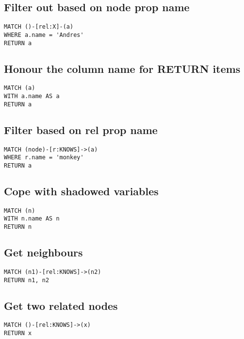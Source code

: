 \subsection{Filter out based on node prop name}

\begin{lstlisting}
MATCH ()-[rel:X]-(a)
WHERE a.name = 'Andres'
RETURN a
\end{lstlisting}

\subsection{Honour the column name for RETURN items}

\begin{lstlisting}
MATCH (a)
WITH a.name AS a
RETURN a
\end{lstlisting}

\subsection{Filter based on rel prop name}

\begin{lstlisting}
MATCH (node)-[r:KNOWS]->(a)
WHERE r.name = 'monkey'
RETURN a
\end{lstlisting}

\subsection{Cope with shadowed variables}

\begin{lstlisting}
MATCH (n)
WITH n.name AS n
RETURN n
\end{lstlisting}

\subsection{Get neighbours}

\begin{lstlisting}
MATCH (n1)-[rel:KNOWS]->(n2)
RETURN n1, n2
\end{lstlisting}

\subsection{Get two related nodes}

\begin{lstlisting}
MATCH ()-[rel:KNOWS]->(x)
RETURN x
\end{lstlisting}

